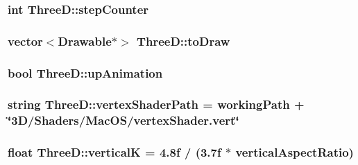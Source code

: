 \subsubsection[{\texorpdfstring{step\+Counter}{stepCounter}}]{\setlength{\rightskip}{0pt plus 5cm}int Three\+D\+::step\+Counter\hspace{0.3cm}{\ttfamily [private]}}\hypertarget{classThreeD_a19f237923a6e43527f9daaa211a0e799}{}\label{classThreeD_a19f237923a6e43527f9daaa211a0e799}
\subsubsection[{\texorpdfstring{to\+Draw}{toDraw}}]{\setlength{\rightskip}{0pt plus 5cm}vector$<$Drawable$\ast$$>$ Three\+D\+::to\+Draw\hspace{0.3cm}{\ttfamily [private]}}\hypertarget{classThreeD_afb93e5ef811c19cb5c37af054ffea094}{}\label{classThreeD_afb93e5ef811c19cb5c37af054ffea094}
\subsubsection[{\texorpdfstring{up\+Animation}{upAnimation}}]{\setlength{\rightskip}{0pt plus 5cm}bool Three\+D\+::up\+Animation\hspace{0.3cm}{\ttfamily [private]}}\hypertarget{classThreeD_a94906891c06e47023741a95039a74454}{}\label{classThreeD_a94906891c06e47023741a95039a74454}
\subsubsection[{\texorpdfstring{vertex\+Shader\+Path}{vertexShaderPath}}]{\setlength{\rightskip}{0pt plus 5cm}string Three\+D\+::vertex\+Shader\+Path = {\bf working\+Path} + \char`\"{}3\+D/\+Shaders/\+Mac\+O\+S/vertex\+Shader.\+vert\char`\"{}\hspace{0.3cm}{\ttfamily [private]}}\hypertarget{classThreeD_ad9906a3d16b91484c8920147f6cbe46e}{}\label{classThreeD_ad9906a3d16b91484c8920147f6cbe46e}
\subsubsection[{\texorpdfstring{verticalK}{verticalK}}]{\setlength{\rightskip}{0pt plus 5cm}float Three\+D\+::verticalK = 4.\+8f / (3.\+7f $\ast$ vertical\+Aspect\+Ratio)\hspace{0.3cm}{\ttfamily [private]}}\hypertarget{classThreeD_ad1d42243a8752a3cabe7fdd2fa72d18e}{}\label{classThreeD_ad1d42243a8752a3cabe7fdd2fa72d18e}
